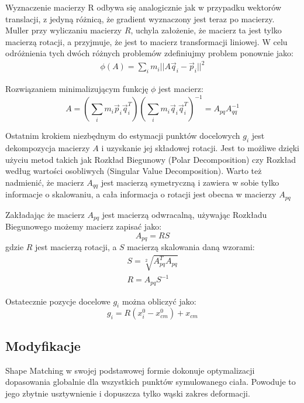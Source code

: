 Wyznaczenie macierzy R odbywa się analogicznie jak w przypadku wektorów
translacji, z jedyną różnicą, że gradient wyznaczony jest teraz po macierzy.
Muller \cite{shape} przy wyliczaniu macierzy $R$, uchyla założenie, że macierz ta
jest tylko macierzą rotacji, a przyjmuje, że jest to macierz transformacji
liniowej. W celu odróżnienia tych dwóch różnych problemów zdefiniujmy problem
ponownie jako:
\begin{eqnarray}
\phi(A) = \sum_i m_i || A \vec{q}_i - \vec{p}_i||^2
\end{eqnarray}

Rozwiązaniem minimalizującym funkcję $\phi$ jest macierz:\cite{shape}
\begin{equation}
A = (\sum_i m_i \vec{p}_i \vec{q}^T_i)(\sum_i m_i \vec{q}_i \vec{q}^T_i)^{-1}
= A_{pq} A_{qq}^{-1}
\end{equation}

Ostatnim krokiem niezbędnym do estymacji punktów docelowych $g_i$ jest
dekompozycja macierzy $A$ i uzyskanie jej składowej rotacji. Jest to możliwe dzięki
użyciu metod takich jak Rozkład Biegunowy (Polar Decomposition) czy Rozkład
według wartości osobliwych (Singular Value Decomposition). Warto też nadmienić,
	że macierz $A_{qq}$ jest macierzą symetryczną i zawiera w sobie tylko
	informacje o skalowaniu, a cała informacja o rotacji jest obecna w
	macierzy $A_{pq}$

Zakładając że macierz $A_{pq}$ jest macierzą odwracalną, używając Rozkładu
Biegunowego możemy macierz zapisać jako:
\begin{equation}
A_{pq} = RS
\end{equation}
gdzie $R$ jest macierzą rotacji, a $S$ macierzą skalowania daną wzorami:
\begin{eqnarray*}
S = \sqrt[2]{A^T_{pq} A_{pq}}\\
R = A_{pq} S^{-1}
\end{eqnarray*}

Ostatecznie pozycje docelowe $g_i$ można obliczyć jako:
\begin{equation}
g_i = R(x_i^0 - x^0_{cm}) + x_{cm}
\end{equation}

\subsection{Modyfikacje}
\label{ssec:region}
Shape Matching w swojej podstawowej formie dokonuje optymalizacji dopasowania
globalnie dla wszystkich punktów symulowanego ciała. Powoduje to jego zbytnie
usztywnienie i dopuszcza tylko wąski zakres deformacji.

